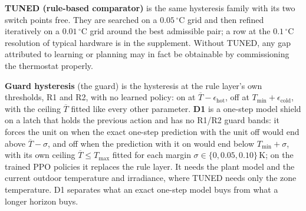\documentclass[pdflatex,sn-mathphys-num,iicol]{sn-jnl}
\theoremstyle{thmstyleone}\newtheorem{proposition}{Proposition}\newtheorem{corollary}{Corollary}
\theoremstyle{thmstyletwo}\newtheorem{remark}{Remark}\newtheorem{observation}{Observation}
\theoremstyle{thmstylethree}\newtheorem{definition}{Definition}
\newcommand{\Tmin}{T_{\min}}
\newcommand{\Tmax}{T_{\max}}
\begin{document}
\textbf{TUNED (rule-based comparator)} is the same hysteresis family with its two switch points free. They are searched on a $0.05\,^\circ$C grid and then refined iteratively on a $0.01\,^\circ$C grid around the best admissible pair; a row at the $0.1\,^\circ$C resolution of typical hardware is in the supplement. Without TUNED, any gap attributed to learning or planning may in fact be obtainable by commissioning the thermostat properly.

\textbf{Guard hysteresis} (the guard) is the hysteresis at the rule layer's own thresholds, R1 and R2, with no learned policy: on at $\overline{T}-\epsilon_{\mathrm{hot}}$, off at $\Tmin+\epsilon_{\mathrm{cold}}$, with the ceiling $\overline{T}$ fitted like every other parameter. \textbf{D1} is a one-step model shield on a latch that holds the previous action and has no R1/R2 guard bands: it forces the unit on when the exact one-step prediction with the unit off would end above $\overline{T}-\sigma$, and off when the prediction with it on would end below $\Tmin+\sigma$, with its own ceiling $\overline{T}\le\Tmax$ fitted for each margin $\sigma\in\{0,0.05,0.10\}\,$K; on the trained PPO policies it replaces the rule layer. It needs the plant model and the current outdoor temperature and irradiance, where TUNED needs only the zone temperature. D1 separates what an exact one-step model buys from what a longer horizon buys.
\end{document}
